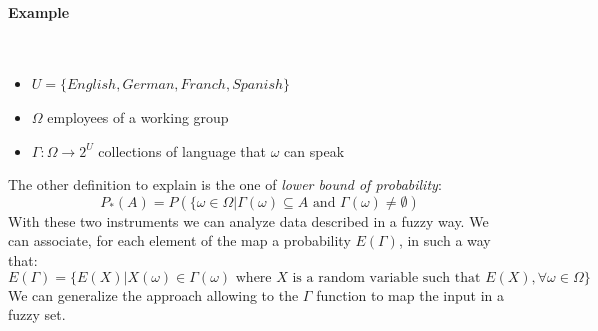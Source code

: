 \documentclass{article}
\begin{document}
\paragraph{Example}\mbox{}\\
\begin{itemize}
    \item $U=\{English, German, Franch, Spanish\}$
    \item $\Omega$ employees of a working group
    \item $\Gamma:\Omega\rightarrow 2^U$ collections of language that $\omega$ can speak
\end{itemize}
The other definition to explain is the one of \textit{lower bound of probability}:
$$P_*(A)=P\left(\{\omega\in\Omega|\Gamma(\omega)\subseteq A\text{ and }\Gamma(\omega)\neq\emptyset\right)$$
With these two instruments we can analyze data described in a fuzzy way. We can associate, for each
element of the map a probability $E(\Gamma)$, in such a way that:
$$E(\Gamma)=\{E(X)|X(\omega)\in\Gamma(\omega)\text{ where }X\text{ is a random variable such that }E(X),\forall\omega\in\Omega\}$$
We can generalize the approach allowing to the $\Gamma$ function to map the input in a fuzzy set.
\end{document}

